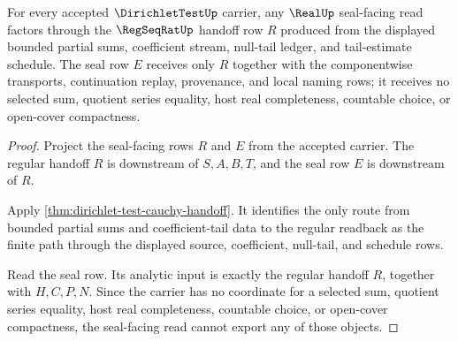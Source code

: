 \begin{theorem}
\label{thm:dirichlet-test-real-seal-boundary}
For every accepted $\DirichletTestUp$ carrier, any $\RealUp$ seal-facing read factors through the $\RegSeqRatUp$ handoff row $R$ produced from the displayed bounded partial sums, coefficient stream, null-tail ledger, and tail-estimate schedule. The seal row $E$ receives only $R$ together with the componentwise transports, continuation replay, provenance, and local naming rows; it receives no selected sum, quotient series equality, host real completeness, countable choice, or open-cover compactness.
\end{theorem}
\begin{proof}
Project the seal-facing rows $R$ and $E$ from the accepted carrier. The regular handoff $R$ is downstream of $S,A,B,T$, and the seal row $E$ is downstream of $R$.

Apply \autoref{thm:dirichlet-test-cauchy-handoff}. It identifies the only route from bounded partial sums and coefficient-tail data to the regular readback as the finite path through the displayed source, coefficient, null-tail, and schedule rows.

Read the seal row. Its analytic input is exactly the regular handoff $R$, together with $H,C,P,N$. Since the carrier has no coordinate for a selected sum, quotient series equality, host real completeness, countable choice, or open-cover compactness, the seal-facing read cannot export any of those objects.
\end{proof}




